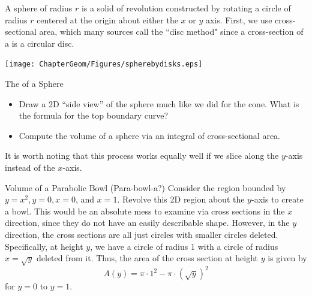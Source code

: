 A sphere of radius $r$ is a solid of revolution constructed by rotating a circle of radius $r$ centered at the origin about either the $x$ or $y$ axis.  First, we use cross-sectional area, which many sources call the ``disc method" since a cross-section of a  is a circular disc.  

	\begin{center}
		\texttt{[image: ChapterGeom/Figures/spherebydisks.eps]}
	\end{center} 

\begin{exercise}{The  of a Sphere \Coffeecup \Coffeecup}
\begin{itemize} \item Draw a 2D ``side view'' of the sphere much like we did for the cone.  What is the formula for the top boundary curve? 


\item Compute the volume of a sphere via an integral of cross-sectional area.


\end{itemize}
\end{exercise}

It is worth noting that this process works equally well if we slice along the $y$-axis instead of the $x$-axis.  

\begin{example}{Volume of a Parabolic Bowl (Para-bowl-a?)}
Consider the region bounded by $y=x^2, y=0,x=0$, and $x=1$.  Revolve this 2D region about the $y$-axis to create a bowl.  This would be an absolute mess to examine via cross sections in the $x$ direction, since they do not have an easily describable shape.  However, in the $y$ direction, the cross sections are all just circles with smaller circles deleted.  Specifically, at height $y$, we have a circle of radius 1 with a circle of radius $x=\sqrt{y}$ deleted from it.  Thus, the area of the cross section at height $y$ is given by $$A(y)=\pi\cdot 1^2-\pi \cdot \left(\sqrt{y}\right)^2 $$ for $y=0$ to $y=1$. 
\end{example}

